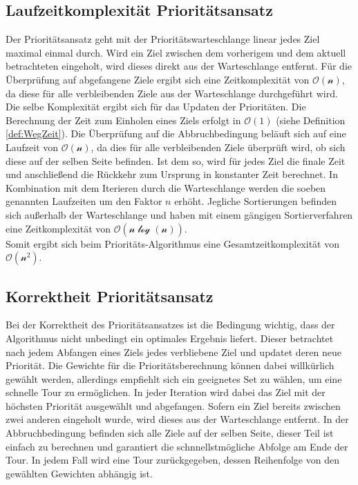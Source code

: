 \documentclass[german,version-2019-11]{uzl-thesis}
\begin{document}
\subsection{Laufzeitkomplexität Prioritätsansatz}

Der Prioritätsansatz geht mit der Prioritätswarteschlange linear jedes Ziel maximal einmal durch. Wird ein Ziel zwischen dem vorherigem und dem aktuell betrachteten eingeholt, wird dieses direkt aus der Warteschlange entfernt. 
Für die Überprüfung auf abgefangene Ziele ergibt sich eine Zeitkomplexität von $\mathcal{O(n)}$, da diese für alle verbleibenden Ziele aus der Warteschlange durchgeführt wird. Die selbe Komplexität ergibt sich für das Updaten der Prioritäten. Die Berechnung der Zeit zum Einholen eines Ziels erfolgt in $\mathcal{O(1)}$ (siehe Definition \ref{def:WegZeit}). Die Überprüfung auf die Abbruchbedingung beläuft sich auf eine Laufzeit von $\mathcal{O(n)}$, da dies für alle verbleibenden Ziele überprüft wird, ob sich diese auf der selben Seite befinden. Ist dem so, wird für jedes Ziel die finale Zeit und anschließend die Rückkehr zum Ursprung in konstanter Zeit berechnet. In Kombination mit dem Iterieren durch die Warteschlange werden die soeben genannten Laufzeiten um den Faktor $n$ erhöht. Jegliche Sortierungen befinden sich außerhalb der Warteschlange und haben mit einem gängigen Sortierverfahren \cite{kaaser2014algorithmen} eine Zeitkomplexität von $\mathcal{O(n\log(n))}$. \\
Somit ergibt sich beim Prioritäts-Algorithmus eine Gesamtzeitkomplexität von $\mathcal{O(n^2)}$.

\subsection{Korrektheit Prioritätsansatz}
Bei der Korrektheit des Prioritätsansatzes ist die Bedingung wichtig, dass der Algorithmus nicht unbedingt ein optimales Ergebnis liefert. Dieser betrachtet nach jedem Abfangen eines Ziels jedes verbliebene Ziel und updatet deren neue Priorität. Die Gewichte für die Prioritätsberechnung können dabei willkürlich gewählt werden, allerdings empfiehlt sich ein geeignetes Set zu wählen, um eine schnelle Tour zu ermöglichen. In jeder Iteration wird dabei das Ziel mit der höchsten Priorität ausgewählt und abgefangen. Sofern ein Ziel bereits zwischen zwei anderen eingeholt wurde, wird dieses aus der Warteschlange entfernt. In der Abbruchbedingung befinden sich alle Ziele auf der selben Seite, dieser Teil ist einfach zu berechnen und garantiert die schnnellstmögliche Abfolge am Ende der Tour. In jedem Fall wird eine Tour zurückgegeben, dessen Reihenfolge von den gewählten Gewichten abhängig ist.
\end{document}
